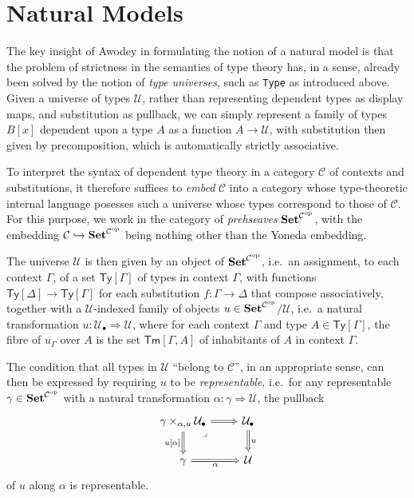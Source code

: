 \documentclass[
  11pt,
  oneside,
  article]{memoir}
\theoremstyle{definition}
\theoremstyle{plain}
\newcommand{\Cat}[1]{\mathbf{#1}}%
\newcommand{\op}{^\tn{op}}
\newcommand{\tn}[1]{\textnormal{#1}}
\newcommand{\smset}{\Cat{Set}}
\newcommand{\0}{\textsf{0}}
\newcommand{\1}{\tn{\textsf{1}}}
\begin{document}
\section{Natural Models}\label{natural-models}

The key insight of Awodey in formulating the notion of a natural model
is that the problem of strictness in the semantics of type theory has,
in a sense, already been solved by the notion of \emph{type universes},
such as \texttt{Type} as introduced above. Given a universe of types
\(\mathcal{U}\), rather than representing dependent types as display
maps, and substitution as pullback, we can simply represent a family of
types \(B[x]\) dependent upon a type \(A\) as a function
\(A \to \mathcal{U}\), with substitution then given by precomposition,
which is automatically strictly associative.

To interpret the syntax of dependent type theory in a category
\(\mathcal{C}\) of contexts and substitutions, it therefore suffices to
\emph{embed} \(\mathcal{C}\) into a category whose type-theoretic
internal language posesses such a universe whose types correspond to
those of \(\mathcal{C}\). For this purpose, we work in the category of
\emph{prehseaves} \(\smset^{\mathcal{C}\op}\), with the
embedding
\(\mathcal{C} \hookrightarrow \smset^{\mathcal{C}\op}\) being
nothing other than the Yoneda embedding.

The universe \(\mathcal{U}\) is then given by an object of
\(\smset^{\mathcal{C}\op}\), i.e.~an assignment, to each context
\(\Gamma\), of a set \(\mathsf{Ty}[\Gamma]\) of types in context
\(\Gamma\), with functions
\(\mathsf{Ty}[\Delta] \to \mathsf{Ty}[\Gamma]\) for each substitution
\(f : \Gamma \to \Delta\) that compose associatively, together with a
\(\mathcal{U}\)-indexed family of objects
\(u \in \smset^{\mathcal{C}\op}\)\!\(/\mathcal{U}\), i.e.~a natural
transformation \(u : \mathcal{U}_\bullet \Rightarrow \mathcal{U}\),
where for each context \(\Gamma\) and type
\(A \in \mathsf{Ty}[\Gamma]\), the fibre of \(u_\Gamma\) over \(A\) is
the set \(\mathsf{Tm}[\Gamma,A]\) of inhabitants of \(A\) in context
\(\Gamma\).

The condition that all types in \(\mathcal{U}\) ``belong to
\(\mathcal{C}\)'', in an appropriate sense, can then be expressed by
requiring \(u\) to be \emph{representable}, i.e.~for any representable
\(\gamma \in \smset^{\mathcal{C}\op}\) with a natural
transformation \(\alpha : \gamma \Rightarrow \mathcal{U}\), the pullback
\[
\begin{tikzcd}
    {\mathcal{\gamma} \times_{\alpha, u} \mathcal{U}_\bullet} & {\mathcal{U}_\bullet} \\
    \gamma & {\mathcal{U}}
    \arrow[Rightarrow, from=1-1, to=1-2]
    \arrow["{u[\alpha]}"', Rightarrow, from=1-1, to=2-1]
    \arrow["\lrcorner"{anchor=center, pos=0.125}, draw=none, from=1-1, to=2-2]
    \arrow["u", Rightarrow, from=1-2, to=2-2]
    \arrow["\alpha"', Rightarrow, from=2-1, to=2-2]
\end{tikzcd}
\] of \(u\) along \(\alpha\) is representable.
\end{document}
